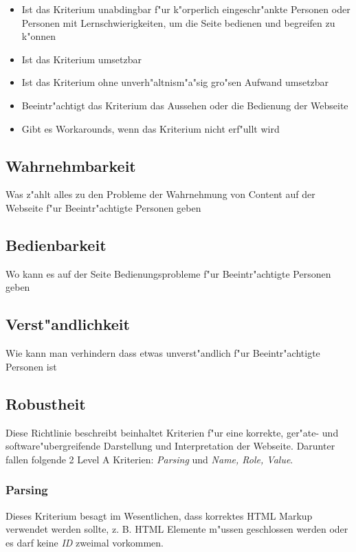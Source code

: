 \documentclass[a4paper,bibtotoc,oneside]{scrbook}
\begin{document}
\begin{itemize}
\item Ist das Kriterium unabdingbar f"ur k"orperlich eingeschr"ankte Personen oder Personen mit Lernschwierigkeiten, um die Seite bedienen und begreifen zu k"onnen
\item Ist das Kriterium umsetzbar
\item Ist das Kriterium ohne unverh"altnism"a"sig gro"sen Aufwand umsetzbar
\item Beeintr"achtigt das Kriterium das Aussehen oder die Bedienung der Webseite
\item Gibt es Workarounds, wenn das Kriterium nicht erf"ullt wird
\end{itemize}


\subsection{Wahrnehmbarkeit}
Was z"ahlt alles zu den Probleme der Wahrnehmung von Content auf der Webseite  f"ur Beeintr"achtigte Personen geben

\subsection{Bedienbarkeit}
Wo kann es auf der Seite Bedienungsprobleme f"ur Beeintr"achtigte Personen geben

\subsection{Verst"andlichkeit}
Wie kann man verhindern dass etwas unverst"andlich  f"ur Beeintr"achtigte Personen ist

\subsection{Robustheit}
Diese Richtlinie beschreibt beinhaltet Kriterien f"ur eine korrekte, ger"ate- und software"ubergreifende Darstellung und Interpretation der Webseite. Darunter fallen folgende 2 Level A Kriterien: \emph{Parsing} und \emph{Name, Role, Value}. \cite[Abschnitt 4.1]{wcag2}

\subsubsection{Parsing}
Dieses Kriterium besagt im Wesentlichen, dass korrektes HTML Markup verwendet werden sollte, z. B. HTML Elemente m"ussen geschlossen werden oder es darf keine \emph{ID} zweimal vorkommen. \cite[Abschnitt 4.1.1]{wcag2}
\end{document}

